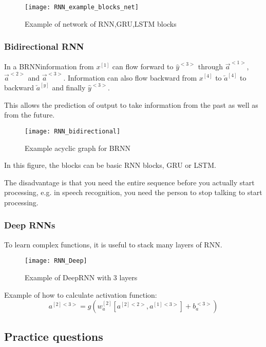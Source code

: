 \begin{figure}[H]
\centering
\texttt{[image: RNN\_example\_blocks\_net]}
\caption{Example of network of RNN,GRU,LSTM blocks}
\end{figure}

\subsubsection{Bidirectional RNN}In a BRNNinformation from $x^{[1]}$ can flow forward to $\hat{y}^{<3>}$ through $\vec{a}^{<1>}$, $\vec{a}^{<2>}$ and  $\vec{a}^{<3>}$. Information can also flow backward from $x^{[4]}$ to $\overleftarrow{a}^{[4]}$ to backward $\overleftarrow{a}^{[y]}$ and finally $\hat{y}^{<3>}$.

This allows the prediction of output to take information from the past as well as from the future.
\begin{figure}[H]
\centering
\texttt{[image: RNN\_bidirectional]}
\caption{Example acyclic graph for BRNN}
\end{figure}
In this figure, the blocks can be basic RNN blocks, GRU or LSTM.

The disadvantage is that you need the entire sequence before you actually start processing, e.g. in speech recognition, you need the person to stop talking to start processing.

\subsubsection{Deep RNNs}
To learn complex functions, it is useful to stack many layers of RNN.
\begin{figure}[H]
\centering
\texttt{[image: RNN\_Deep]}
\caption{Example of DeepRNN with 3 layers}
\end{figure}
Example of how to calculate activation function:
\begin{equation*}
    a^{{[2]}<3>} = g(w^{[2]}_a [ a^{{[2]}<2>}, a^{{[1]}<3>} ] + b^{<3>}_a )
\end{equation*}

\subsection{Practice questions}



